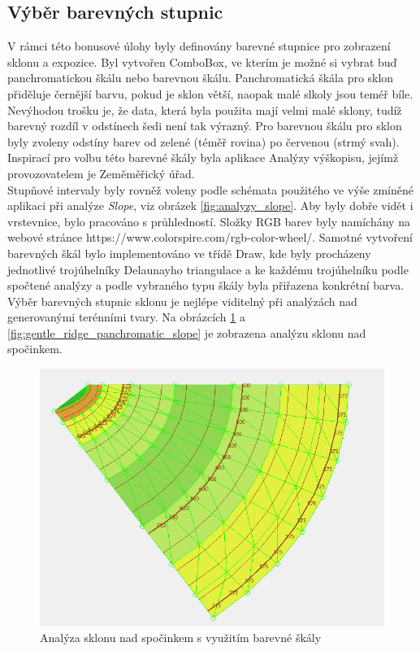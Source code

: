 \documentclass[a4paper,11pt,twoside]{article}
\begin{document}
\subsection{Výběr barevných stupnic}
V rámci této bonusové úlohy byly definovány barevné stupnice pro zobrazení sklonu a expozice. Byl vytvořen ComboBox, ve kterím je možné si vybrat buď panchromatickou škálu nebo barevnou škálu. Panchromatická škála pro sklon přiděluje černější barvu, pokud je sklon větší, naopak malé slkoly jsou teméř bíle. Nevýhodou trošku je, že data, která byla použita mají velmi malé sklony, tudíž barevný rozdíl v odstínech šedi není tak výrazný. Pro barevnou škálu pro sklon byly zvoleny odstíny barev od zelené (téměř rovina) po červenou (strmý svah). Inspirací pro volbu této barevné škály byla aplikace Analýzy výškopisu, jejímž provozovatelem je Zeměměřický úřad. \\
\indent Stupňové intervaly byly rovněž voleny podle schémata použitého ve výše zmíněné aplikaci při analýze \textit{Slope}, viz obrázek \ref{fig:analyzy_slope}. Aby byly dobře vidět i vrstevnice, bylo pracováno s průhledností. Složky RGB barev byly namíchány na webové stránce https://www.colorspire.com/rgb-color-wheel/. Samotné vytvoření barevných škál bylo implementováno ve třídě Draw, kde byly procházeny jednotlivé trojúhelníky Delaunayho triangulace a ke každému trojúhelníku podle spočtené analýzy a podle vybraného typu škály byla přiřazena konkrétní barva. Výběr barevných stupnic sklonu je nejlépe viditelný při analýzách nad generovanými terénními tvary. Na obrázcích \ref{fig:gentle_ridge_colorful_slope} a \ref{fig:gentle_ridge_panchromatic_slope}  je zobrazena analýzu sklonu nad spočinkem.

\vspace{0.2cm}
\begin{figure}[hbt!] 
\begin{center}
\includegraphics[width=12cm]{pictures/gentle_ridge_colorful_slope.PNG} 
\caption[Analýza sklonu nad spočinkem s využitím barevné škály]{Analýza sklonu nad spočinkem s využitím barevné škály}
\label{fig:gentle_ridge_colorful_slope}
\end{center}
\end{figure}
\end{document}
